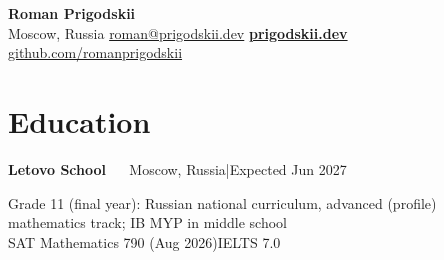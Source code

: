 \documentclass[letterpaper,10pt]{article}
\newif\ifresume
\newcommand{\rs}[2]{\ifresume#1\else#2\fi}
\newcommand{\entry}[3]{%
  \par\needspace{3\baselineskip}\noindent\textbf{#1}%
  \if\relax\detokenize{#2}\relax\else\ \textendash\ #2\fi
  \hfill #3\par}
\newcommand{\sep}{\enspace|\enspace}
\begin{document}
\begin{center}
  {\Huge\bfseries Roman Prigodskii}\\[0.45em]
  Moscow, Russia\enspace\textbullet\enspace
  \href{mailto:roman@prigodskii.dev}{roman@prigodskii.dev}\enspace\textbullet\enspace
  \href{https://prigodskii.dev/}{\textbf{prigodskii.dev}}\enspace\textbullet\enspace
  \href{https://github.com/romanprigodskii}{github.com/romanprigodskii}
\end{center}
\vspace{-0.7em}

\section*{Education}
\entry{Letovo School}{}{Moscow, Russia\sep Expected Jun 2027}
\rs{Grade 11 (final year), advanced (profile) mathematics track\enspace\textbullet\enspace SAT Mathematics 790 (Aug 2026)\enspace\textbullet\enspace IELTS 7.0}%
   {Grade 11 (final year): Russian national curriculum, advanced (profile) mathematics track; IB MYP in middle school\\
    SAT Mathematics 790 (Aug 2026)\enspace\textbullet\enspace IELTS 7.0}
\end{document}
